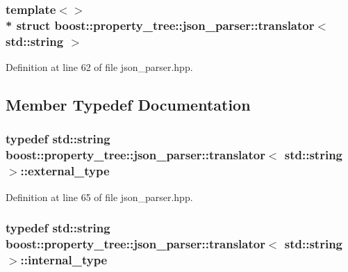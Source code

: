 \subsubsection*{template$<$$>$\\*
struct boost\+::property\+\_\+tree\+::json\+\_\+parser\+::translator$<$ std\+::string $>$}



Definition at line 62 of file json\+\_\+parser.\+hpp.



\subsection{Member Typedef Documentation}
\subsubsection[{\texorpdfstring{external\+\_\+type}{external_type}}]{\setlength{\rightskip}{0pt plus 5cm}typedef std\+::string {\bf boost\+::property\+\_\+tree\+::json\+\_\+parser\+::translator}$<$ std\+::string $>$\+::{\bf external\+\_\+type}}\hypertarget{structboost_1_1property__tree_1_1json__parser_1_1translator_3_01std_1_1string_01_4_a31b953272d7ddc4de96930a64e01c25a}{}\label{structboost_1_1property__tree_1_1json__parser_1_1translator_3_01std_1_1string_01_4_a31b953272d7ddc4de96930a64e01c25a}


Definition at line 65 of file json\+\_\+parser.\+hpp.

\subsubsection[{\texorpdfstring{internal\+\_\+type}{internal_type}}]{\setlength{\rightskip}{0pt plus 5cm}typedef std\+::string {\bf boost\+::property\+\_\+tree\+::json\+\_\+parser\+::translator}$<$ std\+::string $>$\+::{\bf internal\+\_\+type}}\hypertarget{structboost_1_1property__tree_1_1json__parser_1_1translator_3_01std_1_1string_01_4_a0442088549debbf3d26b2506b4bd7aad}{}\label{structboost_1_1property__tree_1_1json__parser_1_1translator_3_01std_1_1string_01_4_a0442088549debbf3d26b2506b4bd7aad}


